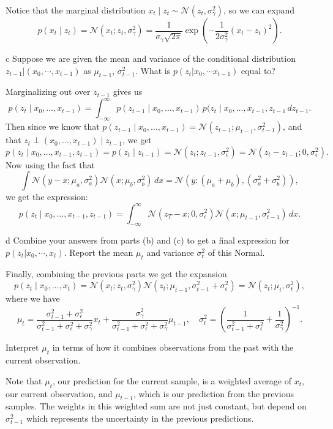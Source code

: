 \documentclass[expanded]{lkx_pset}
\begin{document}
\begin{parts}
\begin{parts}
		Notice that the marginal distribution $x_t\mid z_t \sim \mathcal{N}(z_t, \sigma_\gamma^2)$, so we can expand
		\[
			p(x_t\mid z_t) = \mathcal{N}(x_t; z_t, \sigma^2_\gamma) = \frac{1}{\sigma_\gamma \sqrt{2\pi}}\exp\left( -\frac{1}{2\sigma_\gamma^2}(x_t -z_t)^2\right).
		\]

		\begin{part}{c} Suppose we are given the mean and variance of the conditional distribution $z_{t-1}|(x_0, \cdots, x_{t-1})$ as $\mu_{t-1}$, $\sigma^2_{t-1}$. What is $p(z_t|x_0, \cdots x_{t-1})$ equal to?
		\end{part}

		Marginalizing out over $z_{t-1}$ gives us
		\[
			p(z_t\mid x_0, \ldots, x_{t-1}) = \int_{-\infty}^\infty p(z_{t-1} \mid x_0, \ldots, x_{t-1})\, p(z_t\mid x_0,\ldots, x_{t-1}, z_{t-1} \,dz_{t-1}.
		\]
		Then since we know that $p(z_{t-1}\mid x_0,\ldots, x_{t-1}) = \mathcal{N}(z_{t-1};\mu_{t-1}, \sigma^2_{t-1})$, and that $z_t \perp (x_0,\ldots, x_{t-1})\mid z_{t-1}$, we get
		\[
			p(z_t \mid x_0, \ldots, x_{t-1}, z_{t-1}) = p(z_t\mid z_{t-1}) = \mathcal{N}(z_t; z_{t-1}, \sigma_\epsilon^2) = \mathcal{N}(z_t - z_{t-1}; 0, \sigma^2_\epsilon).
		\]
		Now using the fact that
		\[\int \mathcal{N}(y-x ; \mu_a, \sigma^2_a)\mathcal{N}(x ; \mu_b, \sigma^2_b)\,dx = \mathcal{N}(y ; (\mu_a + \mu_b), (\sigma^2_a + \sigma^2_b)),\]
		we get the expression:
		\[
			p(z_t\mid x_0,\ldots, x_{t-1}, z_{t-1})
			= \int_{-\infty}^\infty \mathcal{N}(z_T - x; 0, \sigma_\epsilon^2) \mathcal{N}(x; \mu_{t-1},\sigma_{t-1}^2)\,dx.
		\]

		\begin{part}{d} Combine your answers from parts (b) and (c) to get a final expression for $p(z_t|x_0, \cdots, x_t)$. Report the mean $\mu_t$ and variance $\sigma_t^2$ of this Normal.
		\end{part}

		Finally, combining the previous parts we get the expansion
		\[
			p(z_t\mid x_0, \ldots, x_t) = \mathcal{N}(x_t; z_t,\sigma_\gamma^2)\mathcal{N}(z_t; \mu_{t-1}, \sigma_{t-1}^2 + \sigma_\epsilon^2)=\mathcal{N}(z_t; \mu_t, \sigma_t^2),
		\]
		where we have
		\[
			\mu_t = \frac{\sigma^2_{t-1}+\sigma^2_\epsilon}{\sigma^2_{t-1} + \sigma_\epsilon^2 + \sigma_\gamma^2}x_t + \frac{\sigma^2_\gamma}{\sigma^2_{t-1}+\sigma_\epsilon^2 + \sigma_\gamma^2}\mu_{t-1},\quad \sigma^2_t = \left(\frac{1}{\sigma^2_{t-1} + \sigma_\epsilon^2} + \frac{1}{\sigma_\gamma^2}\right)^{-1}.
		\]
	\end{parts}
	\begin{part}{3}Interpret $\mu_t$ in terms of how it combines observations from the past with the current observation.
	\end{part}

	Note that $\mu_t$, our prediction for the current sample, is a weighted average of $x_t$, our current observation, and $\mu_{t-1}$, which is our prediction from the previous samples. The weights in this weighted sum are not just constant, but depend on $\sigma_{t-1}^2$ which represents the uncertainty in the previous predictions.
\end{parts}
\end{document}
